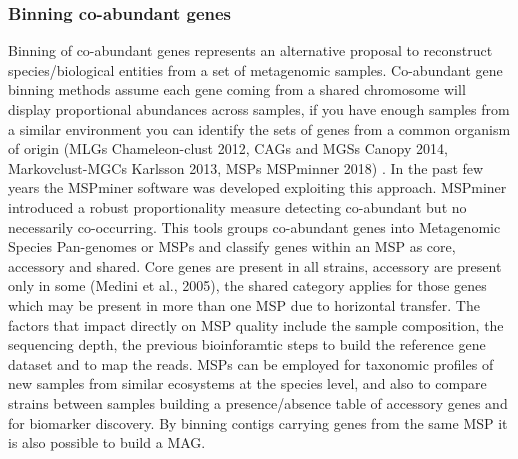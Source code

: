 \documentclass{article}
\begin{document}
\subsubsection{Binning co-abundant genes}
Binning of co-abundant genes represents an alternative proposal to reconstruct species/biological entities from a set of metagenomic samples.
Co-abundant gene binning methods assume each gene coming from a shared chromosome will display proportional abundances across samples, if you have enough samples from a similar environment you can identify the sets of genes from a common organism of origin (MLGs Chameleon-clust 2012, CAGs and MGSs Canopy 2014, Markovclust-MGCs Karlsson 2013, MSPs MSPminner 2018) \cite{karypis1999chameleon, plaza2019mspminer}.
In the past few years the MSPminer software was developed exploiting this approach. MSPminer introduced a robust proportionality measure detecting co-abundant but no necessarily co-occurring.
This tools groups co-abundant genes into Metagenomic Species Pan-genomes or \glspl{MSP} and classify genes within an MSP as core, accessory and shared. Core genes are present in all strains, accessory are present only in some (Medini et al., 2005), the shared category applies for those genes which may be present in more than one MSP due to horizontal transfer.
The factors that impact directly on \gls{MSP} quality include the sample composition, the sequencing depth, the previous bioinforamtic steps to build the reference gene dataset and to map the reads.
MSPs can be employed for taxonomic profiles of new samples from similar ecosystems at the species level, and also to compare strains between samples building a presence/absence table of accessory genes and for biomarker discovery.
By binning contigs carrying genes from the same MSP it is also possible to build a \gls{MAG}.

\end{document}
